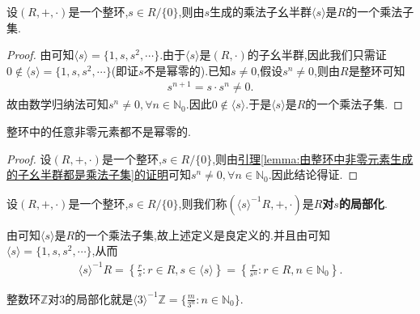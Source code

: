 \documentclass[../../main.tex]{subfiles}
\begin{document}
\begin{lemma}\label{lemma:由整环中非零元素生成的子幺半群都是乘法子集}
设$(R,+,\cdot)$是一个整环,$s\in R/\{0\}$,则由$s$生成的乘法子幺半群$\langle s\rangle$是$R$的一个乘法子集.
\end{lemma}
\begin{proof}
由可知$\langle s \rangle=\{1,s,s^2,\cdots\}$.由于$\langle s\rangle$是$(R,\cdot)$的子幺半群,因此我们只需证$0\notin \langle s \rangle=\{1,s,s^2,\cdots\}$(即证$s$不是幂零的).已知$s\ne 0$,假设$s^n\ne 0$,则由$R$是整环可知
\begin{align*}
s^{n+1}=s\cdot s^n\ne 0.
\end{align*}
故由数学归纳法可知$s^n\ne 0 ,\forall n\in \mathbb{N}_0$.因此$0\notin \langle s \rangle$.于是$\langle s\rangle$是$R$的一个乘法子集.
\end{proof}

\begin{corollary}
整环中的任意非零元素都不是幂零的.
\end{corollary}
\begin{proof}
设$(R,+,\cdot)$是一个整环,$s\in R/\{0\}$,则由\hyperref[lemma:由整环中非零元素生成的子幺半群都是乘法子集]{引理\ref{lemma:由整环中非零元素生成的子幺半群都是乘法子集}的证明}可知$s^n\ne 0 ,\forall n\in \mathbb{N}_0$.因此结论得证.
\end{proof}

\begin{definition}
设$(R,+,\cdot)$是一个整环,$s\in R/\{0\}$,则我们称$(\langle s \rangle^{-1}R,+,\cdot)$是\textbf{$R$对$s$的局部化}.
\end{definition}
\begin{remark}
由可知$\langle s \rangle$是$R$的一个乘法子集,故上述定义是良定义的.并且由可知$\langle s \rangle=\{1,s,s^2,\cdots\}$,从而
\begin{align*}
\langle s\rangle ^{-1}R=\left\{ \frac{r}{s}:r\in R,s\in \langle s\rangle \right\} =\left\{ \frac{r}{s^n}:r\in R,n\in \mathbb{N} _0 \right\} .
\end{align*}
\end{remark}
\begin{note}
整数环$\mathbb{Z}$对$3$的局部化就是$\langle 3\rangle^{-1}\mathbb{Z}=\{\frac{m}{3^n}:n\in \mathbb{N}_0\}.$
\end{note}
\end{document}
